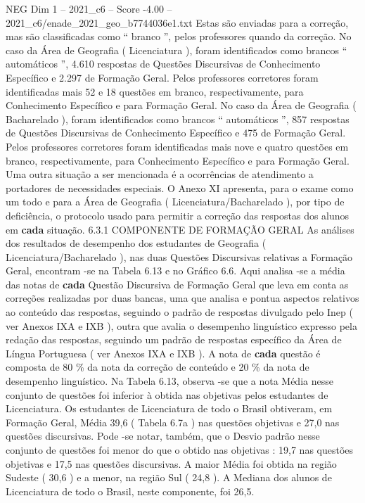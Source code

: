 \begin{textsample}{NEG Dim 1 – 2021\_c6 – Score -4.00 – 2021\_c6/enade\_2021\_geo\_b7744036e1.txt}
Estas são enviadas para a correção, mas são classificadas como “ branco ”, pelos professores quando da correção.
No caso da Área de Geografia ( Licenciatura ), foram identificados como brancos “ automáticos ”, 4.610 respostas de Questões Discursivas de Conhecimento Específico e 2.297 de Formação Geral.
Pelos professores corretores foram identificadas mais 52 e 18 questões em branco, respectivamente, para Conhecimento Específico e para Formação Geral.
No caso da Área de Geografia ( Bacharelado ), foram identificados como brancos “ automáticos ”, 857 respostas de Questões Discursivas de Conhecimento Específico e 475 de Formação Geral.
Pelos professores corretores foram identificadas mais nove e quatro questões em branco, respectivamente, para Conhecimento Específico e para Formação Geral.
Uma outra situação a ser mencionada é a ocorrências de atendimento a portadores de necessidades especiais.
O Anexo XI apresenta, para o exame como um todo e para a Área de Geografia ( Licenciatura/Bacharelado ), por tipo de deficiência, o protocolo usado para permitir a correção das respostas dos alunos em \textbf{cada} situação. 6.3.1 COMPONENTE DE FORMAÇÃO GERAL As análises dos resultados de desempenho dos estudantes de Geografia ( Licenciatura/Bacharelado ), nas duas Questões Discursivas relativas a Formação Geral, encontram -se na Tabela 6.13 e no Gráfico 6.6.
Aqui analisa -se a média das notas de \textbf{cada} Questão Discursiva de Formação Geral que leva em conta as correções realizadas por duas bancas, uma que analisa e pontua aspectos relativos ao conteúdo das respostas, seguindo o padrão de respostas divulgado pelo Inep ( ver Anexos IXA e IXB ), outra que avalia o desempenho linguístico expresso pela redação das respostas, seguindo um padrão de respostas específico da Área de Língua Portuguesa ( ver Anexos IXA e IXB ).
A nota de \textbf{cada} questão é composta de 80 \% da nota da correção de conteúdo e 20 \% da nota de desempenho linguístico.
Na Tabela 6.13, observa -se que a nota Média nesse conjunto de questões foi inferior à obtida nas objetivas pelos estudantes de Licenciatura.
Os estudantes de Licenciatura de todo o Brasil obtiveram, em Formação Geral, Média 39,6 ( Tabela 6.7a ) nas questões objetivas e 27,0 nas questões discursivas.
Pode -se notar, também, que o Desvio padrão nesse conjunto de questões foi menor do que o obtido nas objetivas : 19,7 nas questões objetivas e 17,5 nas questões discursivas.
A maior Média foi obtida na região Sudeste ( 30,6 ) e a menor, na região Sul ( 24,8 ).
A Mediana dos alunos de Licenciatura de todo o Brasil, neste componente, foi 26,5.

\end{textsample}
